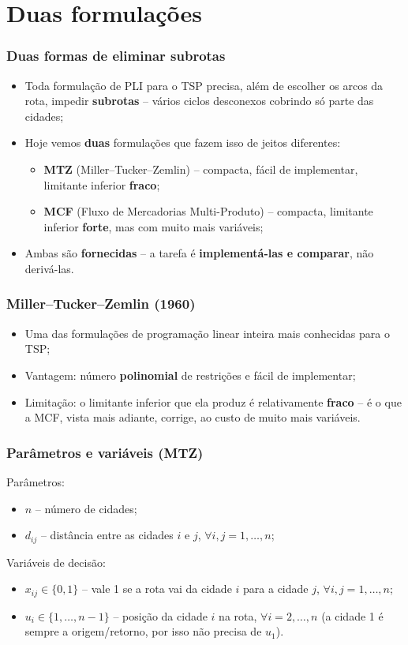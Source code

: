 \documentclass[fleqn]{beamer}
\begin{document}
\section{Duas formulações}

\begin{frame}
	\frametitle{Duas formas de eliminar subrotas}
	\begin{itemize}
		\item Toda formulação de PLI para o TSP precisa, além de escolher
			os arcos da rota, impedir \textbf{subrotas} -- vários ciclos
			desconexos cobrindo só parte das cidades;
		\item Hoje vemos \textbf{duas} formulações que fazem isso de
			jeitos diferentes:
		\begin{itemize}
			\item \textbf{MTZ} (Miller--Tucker--Zemlin) -- compacta, fácil
				de implementar, limitante inferior \textbf{fraco};
			\item \textbf{MCF} (Fluxo de Mercadorias Multi-Produto) --
				compacta, limitante inferior \textbf{forte}, mas com muito
				mais variáveis;
		\end{itemize}
		\item Ambas são \textbf{fornecidas} -- a tarefa é
			\textbf{implementá-las e comparar}, não derivá-las.
	\end{itemize}
\end{frame}

\begin{frame}
	\frametitle{Miller--Tucker--Zemlin (1960)}
	\begin{itemize}
		\item Uma das formulações de programação linear inteira mais
			conhecidas para o TSP;
		\item Vantagem: número \textbf{polinomial} de restrições e fácil
			de implementar;
		\item Limitação: o limitante inferior que ela produz é
			relativamente \textbf{fraco} -- é o que a MCF, vista mais
			adiante, corrige, ao custo de muito mais variáveis.
	\end{itemize}
\end{frame}

\begin{frame}
	\frametitle{Parâmetros e variáveis (MTZ)}
	Parâmetros:
	\begin{itemize}
		\item $n$ -- número de cidades;
		\item $d_{ij}$ -- distância entre as cidades $i$ e $j$, $\forall
			i,j = 1,\ldots,n$;
	\end{itemize}
	Variáveis de decisão:
	\begin{itemize}
		\item $x_{ij} \in \{0,1\}$ -- vale 1 se a rota vai da cidade $i$
			para a cidade $j$, $\forall i,j = 1,\ldots,n$;
		\item $u_i \in \{1,\ldots,n-1\}$ -- posição da cidade $i$ na rota,
			$\forall i = 2,\ldots,n$ (a cidade 1 é sempre a origem/retorno,
			por isso não precisa de $u_1$).
	\end{itemize}
\end{frame}
\end{document}

